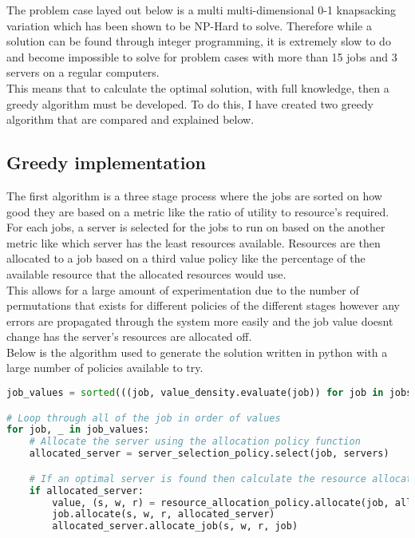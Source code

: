 The problem case layed out below is a multi multi-dimensional 0-1 knapsacking variation which has been shown to be NP-Hard to solve.
Therefore while a solution can be found through integer programming, it is extremely slow to do and become impossible to solve for
problem cases with more than 15 jobs and 3 servers on a regular computers. \\
This means that to calculate the optimal solution, with full knowledge, then a greedy algorithm must be developed.
To do this, I have created two greedy algorithm that are compared and explained below. \\

\subsection{Greedy implementation}\label{subsec:greedy-implementation}
The first algorithm is a three stage process where the jobs are sorted on how good they are based on a metric like the
ratio of utility to resource's required. For each jobs, a server is selected for the jobs to run on based on the another metric
like which server has the least resources available. Resources are then allocated to a job based on a third value policy
like the percentage of the available resource that the allocated resources would use. \\
This allows for a large amount of experimentation due to the number of permutations that exists for different policies of
the different stages however any errors are propagated through the system more easily and the job value doesnt change has
the server's resources are allocated off. \\
Below is the algorithm used to generate the solution written in python with a large number of policies available to try. \\
\begin{lstlisting}[language=Python]
job_values = sorted(((job, value_density.evaluate(job)) for job in jobs), key=lambda jv: jv[1], reverse=True)

# Loop through all of the job in order of values
for job, _ in job_values:
    # Allocate the server using the allocation policy function
    allocated_server = server_selection_policy.select(job, servers)

    # If an optimal server is found then calculate the resource allocation policy
    if allocated_server:
        value, (s, w, r) = resource_allocation_policy.allocate(job, allocated_server)
        job.allocate(s, w, r, allocated_server)
        allocated_server.allocate_job(s, w, r, job)
\end{lstlisting}

